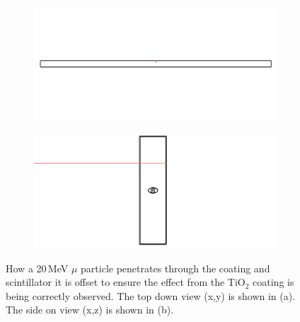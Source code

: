\begin{figure}[!h]
\centering
\begin{subfigure}{.5\textwidth}
  \centering
  \includegraphics[width=\linewidth]{Chapter4/Figs/Raster/year1Plots/lengthOnViewBarMuon1530By720.png}
  \captionsetup{width=.9\linewidth}
  \caption{}
  \label{subFig:lengthOnViewBarMuon1530Square}
\end{subfigure}%
\begin{subfigure}{.5\textwidth}
  \centering
  \includegraphics[width=\linewidth]{Chapter4/Figs/Raster/sideOnViewBarMuon1530By720.png}
  \captionsetup{width=.9\linewidth}
  \caption{}
  \label{subFig:sideOnViewBarMuon8}
\end{subfigure}
\caption{How a 20\,MeV $\mu$ particle penetrates through the coating and scintillator it is offset to ensure the effect from the TiO$_2$ coating is being correctly observed. The top down view (x,y) is shown in (a). The side on view (x,z) is shown in (b).}
\label{fig:lengthAndSideViewBarMuon}
\end{figure}


